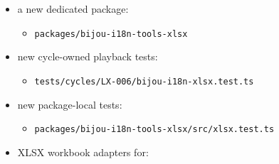 \begin{itemize}
\tightlist
\item
  a new dedicated package:

  \begin{itemize}
  \tightlist
  \item
    \texttt{p\allowbreak{}a\allowbreak{}c\allowbreak{}k\allowbreak{}a\allowbreak{}g\allowbreak{}e\allowbreak{}s\allowbreak{}/\allowbreak{}b\allowbreak{}i\allowbreak{}j\allowbreak{}o\allowbreak{}u\allowbreak{}-\allowbreak{}i\allowbreak{}1\allowbreak{}8\allowbreak{}n\allowbreak{}-\allowbreak{}t\allowbreak{}o\allowbreak{}o\allowbreak{}l\allowbreak{}s\allowbreak{}-\allowbreak{}x\allowbreak{}l\allowbreak{}s\allowbreak{}x}
  \end{itemize}
\item
  new cycle-owned playback tests:

  \begin{itemize}
  \tightlist
  \item
    \texttt{t\allowbreak{}e\allowbreak{}s\allowbreak{}t\allowbreak{}s\allowbreak{}/\allowbreak{}c\allowbreak{}y\allowbreak{}c\allowbreak{}l\allowbreak{}e\allowbreak{}s\allowbreak{}/\allowbreak{}L\allowbreak{}X\allowbreak{}-\allowbreak{}0\allowbreak{}0\allowbreak{}6\allowbreak{}/\allowbreak{}b\allowbreak{}i\allowbreak{}j\allowbreak{}o\allowbreak{}u\allowbreak{}-\allowbreak{}i\allowbreak{}1\allowbreak{}8\allowbreak{}n\allowbreak{}-\allowbreak{}x\allowbreak{}l\allowbreak{}s\allowbreak{}x\allowbreak{}.\allowbreak{}t\allowbreak{}e\allowbreak{}s\allowbreak{}t\allowbreak{}.\allowbreak{}t\allowbreak{}s}
  \end{itemize}
\item
  new package-local tests:

  \begin{itemize}
  \tightlist
  \item
    \texttt{p\allowbreak{}a\allowbreak{}c\allowbreak{}k\allowbreak{}a\allowbreak{}g\allowbreak{}e\allowbreak{}s\allowbreak{}/\allowbreak{}b\allowbreak{}i\allowbreak{}j\allowbreak{}o\allowbreak{}u\allowbreak{}-\allowbreak{}i\allowbreak{}1\allowbreak{}8\allowbreak{}n\allowbreak{}-\allowbreak{}t\allowbreak{}o\allowbreak{}o\allowbreak{}l\allowbreak{}s\allowbreak{}-\allowbreak{}x\allowbreak{}l\allowbreak{}s\allowbreak{}x\allowbreak{}/\allowbreak{}s\allowbreak{}r\allowbreak{}c\allowbreak{}/\allowbreak{}x\allowbreak{}l\allowbreak{}s\allowbreak{}x\allowbreak{}.\allowbreak{}t\allowbreak{}e\allowbreak{}s\allowbreak{}t\allowbreak{}.\allowbreak{}t\allowbreak{}s}
  \end{itemize}
\item
  XLSX workbook adapters for:


\end{itemize}

